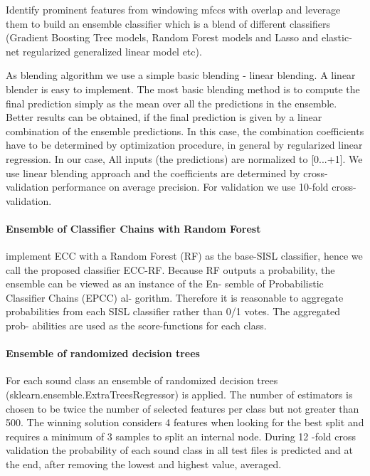 Identify prominent features from windowing mfccs with overlap and leverage them to build an ensemble classifier which is a blend of different classifiers (Gradient Boosting Tree
models, Random Forest models and Lasso and elastic-net regularized generalized linear model etc). 

As blending algorithm we use a simple basic blending - linear blending. A linear blender is easy to
implement. The most basic blending method is to compute the final prediction simply as the mean
over all the predictions in the ensemble. Better results can be obtained, if the final prediction is
given by a linear combination of the ensemble predictions. In this case, the combination coefficients
have to be determined by optimization procedure, in general by regularized linear regression. In our
case, All inputs (the predictions) are normalized to [0...+1]. We use linear blending approach and
the coefficients are determined by cross-validation performance on average precision. For validation
we use 10-fold cross-validation.

\paragraph{Ensemble of Classifier Chains with Random Forest}

\cite{mlsp2} implement ECC \cite{read2011classifier} with a Random Forest (RF) as
the base-SISL classifier, hence we call the proposed
classifier ECC-RF. Because RF outputs a probability,
the ensemble can be viewed as an instance of the En-
semble of Probabilistic Classifier Chains (EPCC) al-
gorithm. Therefore it is
reasonable to aggregate probabilities from each SISL
classifier rather than 0/1 votes. The aggregated prob-
abilities are used as the score-functions for each class.

\paragraph{Ensemble of randomized decision trees}

\cite{Lasseck13} For each sound class an ensemble of
randomized decision trees (sklearn.ensemble.ExtraTreesRegressor) is applied. The number
of estimators is chosen to be twice the number of selected features per class but not greater
than 500. The winning solution considers 4 features when looking for the best split and
requires a minimum of 3 samples to split an internal node. During 12 -fold cross validation
the probability of each sound class in all test files is predicted and at the end, after removing
the lowest and highest value, averaged.

